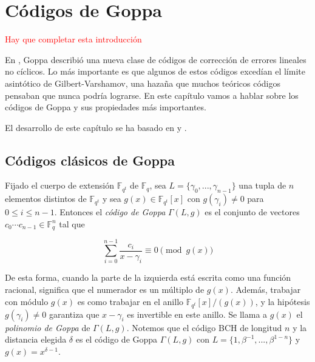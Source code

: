 
\chapter{Códigos de Goppa}

\textcolor{red}{Hay que completar esta introducción}

En \cite{Goppa_codes_1973}, Goppa describió una nueva clase de códigos de corrección de errores lineales no cíclicos. Lo más importante es que algunos de estos códigos excedían el límite asintótico de Gilbert-Varshamov, una hazaña que muchos teóricos códigos pensaban que nunca podría lograrse. En este capítulo vamos a hablar sobre los códigos de Goppa y sus propiedades más importantes.

El desarrollo de este capítulo se ha basado en \cite{Huffman_Pless_2010} y \cite{Goppa_codes_1973}.

\section{Códigos clásicos de Goppa}

Fijado el cuerpo de extensión $\mathbb{F}_{q^t}$ de $\mathbb{F}_q$, sea $L = \{ \gamma_0, ..., \gamma_{n-1} \}$ una tupla de $n$ elementos distintos de $\mathbb{F}_{q^t}$ y sea $g(x) \in \mathbb{F}_{q^t}[x]$ con $g(\gamma_i) \neq 0$ para $0 \leq i \leq n - 1$. Entonces el \emph{código de Goppa} $\Gamma(L,g)$ es el conjunto de vectores $c_0 \cdots c_{n-1} \in \mathbb{F}_q^n$ tal que 

\begin{equation}
    \label{def:goppa}
    \sum_{i=0}^{n-1} \frac{c_i}{x - \gamma_i} \equiv 0 \pmod{g(x)}
\end{equation}

De esta forma, cuando la parte de la izquierda está escrita como una función racional, significa que el numerador es un múltiplo de $g(x)$. Además, trabajar con módulo $g(x)$ es como trabajar en el anillo $\mathbb{F}_{q^t}[x]/(g(x))$, y la hipótesis $g(\gamma_i) \neq 0$ garantiza que $x - \gamma_i$ es invertible en este anillo. Se llama a $g(x)$ el \emph{polinomio de Goppa} de $\Gamma(L,g)$. Notemos que el código BCH de longitud $n$ y la distancia elegida $\delta$ es el código de Goppa $\Gamma(L,g)$ con $L = \{ 1, \beta^{-1}, ..., \beta^{1-n} \}$ y $g(x) = x^{\delta - 1}$.


